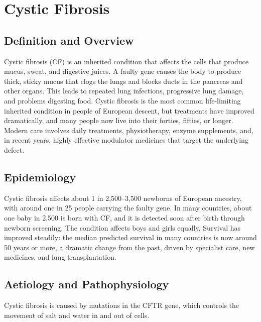 \chapter{Cystic Fibrosis}

\section*{Definition and Overview}
Cystic fibrosis (CF) is an inherited condition that affects the cells that produce mucus, sweat, and digestive juices. A faulty gene causes the body to produce thick, sticky mucus that clogs the lungs and blocks ducts in the pancreas and other organs. This leads to repeated lung infections, progressive lung damage, and problems digesting food. Cystic fibrosis is the most common life-limiting inherited condition in people of European descent, but treatments have improved dramatically, and many people now live into their forties, fifties, or longer. Modern care involves daily treatments, physiotherapy, enzyme supplements, and, in recent years, highly effective modulator medicines that target the underlying defect.

\section*{Epidemiology}
Cystic fibrosis affects about 1 in 2,500--3,500 newborns of European ancestry, with around one in 25 people carrying the faulty gene. In many countries, about one baby in 2,500 is born with CF, and it is detected soon after birth through newborn screening. The condition affects boys and girls equally. Survival has improved steadily: the median predicted survival in many countries is now around 50 years or more, a dramatic change from the past, driven by specialist care, new medicines, and lung transplantation.

\section*{Aetiology and Pathophysiology}
Cystic fibrosis is caused by mutations in the CFTR gene, which controls the movement of salt and water in and out of cells.

